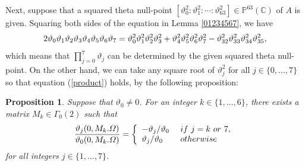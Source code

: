 \documentclass{amsart}
\theoremstyle{definition}
\theoremstyle{plain}
\newtheorem{Prop}[Def]{Proposition}
\begin{document}
Next, suppose that a squared theta null-point $[\vartheta_0^2:\vartheta_1^2:\cdots:\vartheta_{63}^2] \in \mathbb{P}^{63}(\mathbb{C})$ of $A$ is given.
Squaring both sides of the equation in Lemma \ref{01234567}, we have\smallskip
\begin{equation}\label{product}
    2\vartheta_0\vartheta_1\vartheta_2\vartheta_3\vartheta_4\vartheta_5\vartheta_6\vartheta_7 = \vartheta_0^2\vartheta_1^2\vartheta_2^2\vartheta_3^2 + \vartheta_4^2\vartheta_5^2\vartheta_6^2\vartheta_7^2 - \vartheta_{32}^2\vartheta_{33}^2\vartheta_{34}^2\vartheta_{35}^2,\medskip
\end{equation}
which means that $\prod_{j=0}^7 \vartheta_j$ can be determined by the given squared theta null-point.
On the other hand, we can take any square root of $\vartheta_j^2$ for all $j \in \{0,\ldots,7\}$ so that equation (\ref{product}) holds, by the following proposition:
\begin{Prop}\label{construct}
Suppose that $\vartheta_0 \neq 0$.
For an integer $k \in \{1,\ldots,6\}$, there exists a matrix $M_k \in {\varGamma_0(2)}$ such that
\[
    \frac{\vartheta_j(0,M_k.\varOmega)}{\vartheta_0(0,M_k.\varOmega)} = \left\{
    \begin{array}{ll}
        -\vartheta_j/\vartheta_0 \ & {\rm if}\ j = k\ {\rm or}\ 7,\\
        \vartheta_j/\vartheta_0 \ & {\rm otherwise}
    \end{array}
    \right.\smallskip
\]
for all integers $j \in \{1,\ldots,7\}$.
\end{Prop}
\end{document}
